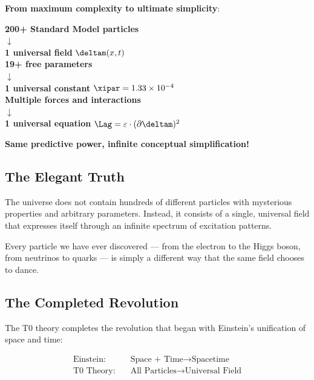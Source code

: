 	\begin{tcolorbox}[colback=green!5!white,colframe=green!75!black,title=The Complete Unification]
		\textbf{From maximum complexity to ultimate simplicity}:
		
		\begin{center}
			\textbf{200+ Standard Model particles} \\
			$\downarrow$ \\
			\textbf{1 universal field} $\deltam(x,t)$ \\[1em]
			
			\textbf{19+ free parameters} \\
			$\downarrow$ \\
			\textbf{1 universal constant} $\xipar = 1.33 \times 10^{-4}$ \\[1em]
			
			\textbf{Multiple forces and interactions} \\
			$\downarrow$ \\
			\textbf{1 universal equation} $\Lag = \varepsilon \cdot (\partial \deltam)^2$
		\end{center}
		
		\textbf{Same predictive power, infinite conceptual simplification!}
	\end{tcolorbox}
	
	\subsection{The Elegant Truth}
	
	The universe does not contain hundreds of different particles with mysterious properties and arbitrary parameters. Instead, it consists of a single, universal field that expresses itself through an infinite spectrum of excitation patterns.
	
	Every particle we have ever discovered --- from the electron to the Higgs boson, from neutrinos to quarks --- is simply a different way that the same field chooses to dance.
	
	\subsection{The Completed Revolution}
	
	The T0 theory completes the revolution that began with Einstein's unification of space and time:
	
	\begin{align}
		\text{Einstein:} \quad &\text{Space + Time} \rightarrow \text{Spacetime} \\
		\text{T0 Theory:} \quad &\text{All Particles} \rightarrow \text{Universal Field}
	\end{align}
	
